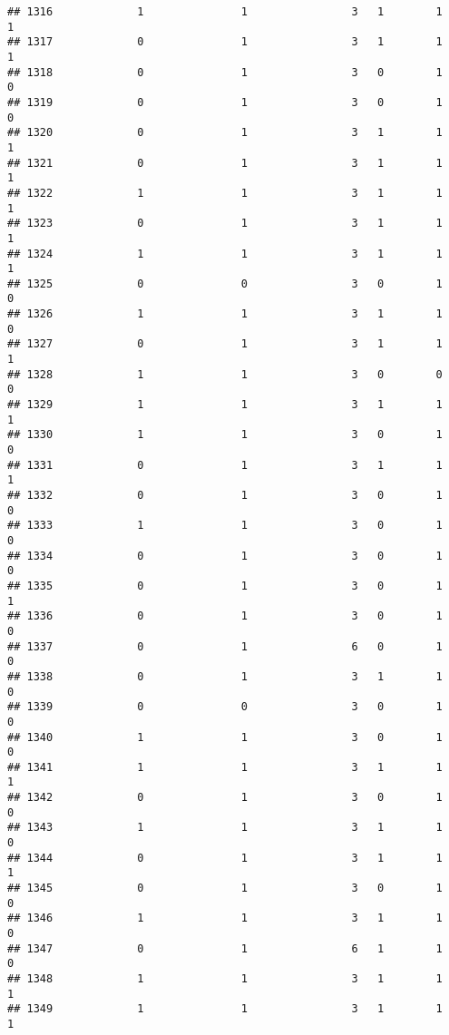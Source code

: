 \documentclass[]{article}
\begin{document}
\begin{verbatim}
## 1316             1               1                3   1        1        1
## 1317             0               1                3   1        1        1
## 1318             0               1                3   0        1        0
## 1319             0               1                3   0        1        0
## 1320             0               1                3   1        1        1
## 1321             0               1                3   1        1        1
## 1322             1               1                3   1        1        1
## 1323             0               1                3   1        1        1
## 1324             1               1                3   1        1        1
## 1325             0               0                3   0        1        0
## 1326             1               1                3   1        1        0
## 1327             0               1                3   1        1        1
## 1328             1               1                3   0        0        0
## 1329             1               1                3   1        1        1
## 1330             1               1                3   0        1        0
## 1331             0               1                3   1        1        1
## 1332             0               1                3   0        1        0
## 1333             1               1                3   0        1        0
## 1334             0               1                3   0        1        0
## 1335             0               1                3   0        1        1
## 1336             0               1                3   0        1        0
## 1337             0               1                6   0        1        0
## 1338             0               1                3   1        1        0
## 1339             0               0                3   0        1        0
## 1340             1               1                3   0        1        0
## 1341             1               1                3   1        1        1
## 1342             0               1                3   0        1        0
## 1343             1               1                3   1        1        0
## 1344             0               1                3   1        1        1
## 1345             0               1                3   0        1        0
## 1346             1               1                3   1        1        0
## 1347             0               1                6   1        1        0
## 1348             1               1                3   1        1        1
## 1349             1               1                3   1        1        1

\end{verbatim}
\end{document}
